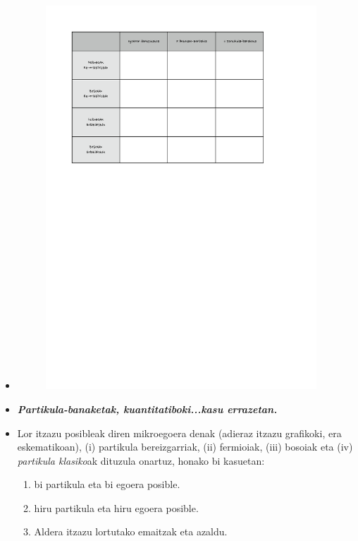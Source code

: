 \documentclass[10pt]{article}              %
\begin{document}
\begin{enumerate}
\begin{itemize}
\item[]
\begin{figure}[h]
\begin{center}
\includegraphics[width=4in,angle=0]{kuestioak1irudia.pdf}
\end{center}
\end{figure}

\vspace{0.5cm}
\item[] \textit{\textbf{Partikula-banaketak, kuantitatiboki...kasu errazetan.}} 
\item[] Lor itzazu posibleak diren mikroegoera denak (adieraz itzazu grafikoki, era eskematikoan), (i) partikula bereizgarriak, (ii) fermioiak, (iii) bosoiak eta (iv) \textit{partikula klasiko}ak dituzula onartuz, honako bi kasuetan:

\begin{enumerate}
\item bi partikula eta bi egoera posible.
\item hiru partikula eta hiru egoera posible.
\item[] Aldera itzazu lortutako emaitzak eta azaldu.
\end{enumerate}
\end{itemize}


\end{enumerate}
%



\end{document}
